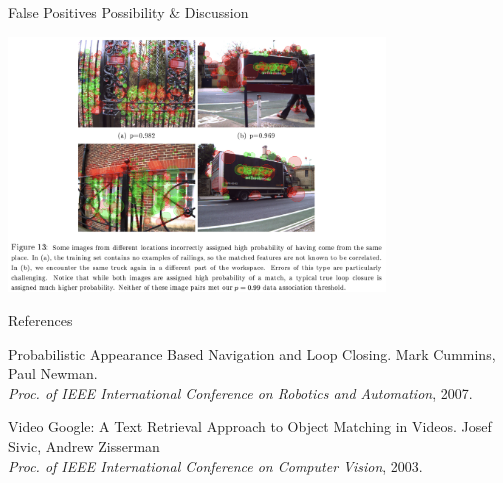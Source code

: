 \documentclass[dvipsnames, handout]{beamer}
\newcommand{\1}{\mathds{1}}	%
\begin{document}
\begin{frame}[t]{False Positives Possibility \& Discussion}
\begin{center}
\includegraphics[width=0.75\textwidth]{imgs/fig13.png}
\end{center}
\end{frame}



\begin{frame}{References}
\begin{thebibliography}{10}
\beamertemplatearticlebibitems
{\small

Probabilistic Appearance Based Navigation and Loop Closing.
\newblock Mark  Cummins, Paul Newman. \\
{\it Proc. of IEEE International Conference on Robotics and Automation}, 2007.

Video Google: A Text Retrieval Approach to Object Matching in Videos.
\newblock Josef Sivic, Andrew Zisserman \\
{\it Proc. of IEEE International Conference on Computer Vision}, 2003.


}
\end{thebibliography}
\end{frame}












\end{document}
